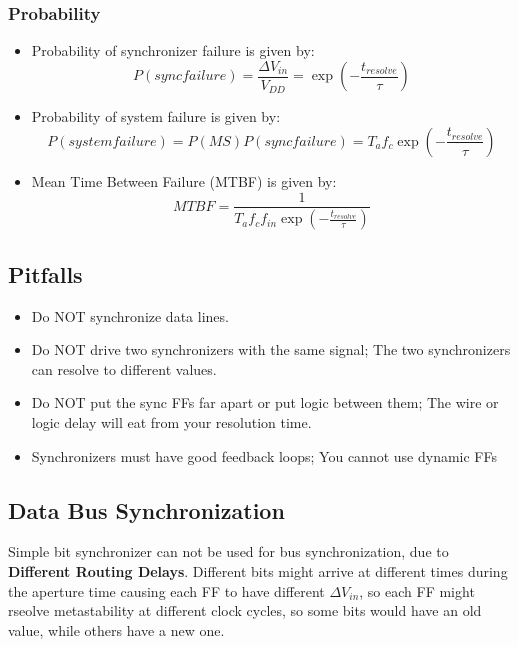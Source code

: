 \documentclass[11pt]{article}
\begin{document}
\subsubsection*{Probability}
\begin{itemize}
    \item Probability of synchronizer failure is given by:
        \begin{equation*}
            P(sync failure) = \frac{\Delta V_{in}}{V_{DD}} = \exp\left(-\frac{t_{resolve}}{\tau}\right)
        \end{equation*}
    \item Probability of system failure is given by:
        \begin{equation*}
            P(system failure) = P(MS)P(sync failure) = T_af_c\exp\left(-\frac{t_{resolve}}{\tau}\right)
        \end{equation*}
    \item Mean Time Between Failure (MTBF) is given by:
        \begin{equation*}
            MTBF = \frac{1}{T_af_cf_{in}\exp\left(-\frac{t_{resolve}}{\tau}\right)}
        \end{equation*}
\end{itemize}



\subsection*{Pitfalls}
\begin{itemize}
    \item Do NOT synchronize data lines.
    \item Do NOT drive two synchronizers with the same signal; The two synchronizers can resolve to different values.
    \item Do NOT put the sync FFs far apart or put logic between them; The wire or logic delay will eat from your resolution time.
    \item Synchronizers must have good feedback loops; You cannot use dynamic FFs
\end{itemize}

\subsection*{Data Bus Synchronization}
Simple bit synchronizer can not be used for bus synchronization, due to \textbf{Different Routing Delays}. Different bits might arrive at different times during the aperture time causing each FF to have different $\Delta V_{in}$, so each FF might rseolve metastability at different clock cycles, so some bits would have an old value, while others have a new one.
\end{document}
